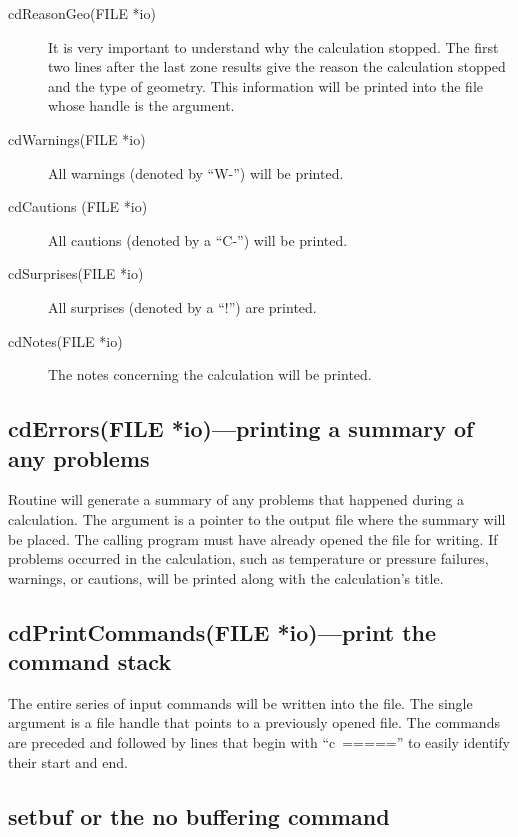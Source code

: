 \begin{description}
\item[cdReasonGeo(FILE *io)]  It is very important to understand why the calculation stopped.
The first two lines after the last zone results give the reason
the calculation stopped and the type of geometry.
This information will
be printed into the file whose handle is the argument.

\item[cdWarnings(FILE *io)]  All warnings (denoted by ``W-'') will be printed.

\item[cdCautions (FILE *io)]  All cautions (denoted by a ``C-'') will be printed.

\item[cdSurprises(FILE *io)]  All surprises (denoted by a ``!'') are printed.

\item[cdNotes(FILE *io)]  The notes concerning the calculation will be printed.
\end{description}

\subsection{cdErrors(FILE *io)---printing a summary of any problems}

Routine  will generate a summary
of any problems that happened during a calculation.
The argument is a pointer to the output
file where the summary will be placed.
The calling program must have already
opened the file for writing.
If problems occurred in the calculation, such
as temperature or pressure failures, warnings, or cautions,
will be printed
along with the calculation's title.

\subsection{cdPrintCommands(FILE *io)---print the command stack}

The entire series of input commands will be written into the file.  The
single argument is a file handle that points to a previously opened file.
The commands are preceded and followed by lines that begin with
``c~=====''
to easily identify their start and end.

\subsection{setbuf or the no buffering command}

